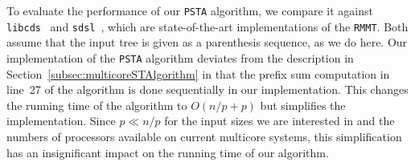 To evaluate the performance of our {\tt PSTA} algorithm, we compare it against
{\tt libcds}~\cite{libcds} and {\tt sdsl}~\cite{sdsl}, which are
state-of-the-art implementations of the {\tt RMMT}.
Both assume that the input tree is given as a parenthesis sequence, as we do
here.
Our implementation of the {\tt PSTA} algorithm deviates from the description in
Section~\ref{subsec:multicoreSTAlgorithm} in that the prefix sum computation in
line~27 of the algorithm is done sequentially in our implementation.
This changes the running time of the algorithm to $O(n/p + p)$ but simplifies
the implementation.
Since $p \ll n/p$ for the input sizes we are interested in and the numbers of
processors available on current multicore systems, this simplification has an
insignificant impact on the running time of our algorithm.

